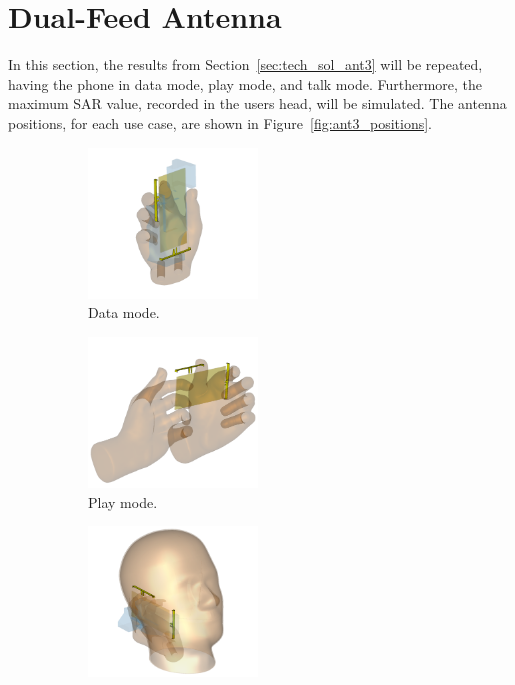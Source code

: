 \section{Dual-Feed Antenna}
In this section, the results from Section~\ref{sec:tech_sol_ant3} will be repeated, having the phone in data mode, play mode, and talk mode. Furthermore, the maximum SAR value, recorded in the users head, will be simulated. The antenna positions, for each use case, are shown in Figure~\ref{fig:ant3_positions}.

\begin{figure}[htbp]
    \centering
    \begin{subfigure}[b]{0.24\linewidth}
        \centering
        \includegraphics[width=\linewidth,height=4cm,keepaspectratio]{img/tech_sol/nonresonant/simulation/data_mode/3d}
        \caption{Data mode.}
    \end{subfigure}
    \begin{subfigure}[b]{0.24\linewidth}
        \centering
        \includegraphics[width=\linewidth,height=4cm,keepaspectratio]{img/tech_sol/nonresonant/simulation/play_mode/3d}
        \caption{Play mode.}
    \end{subfigure}
    \begin{subfigure}[b]{0.24\linewidth}
        \centering
        \includegraphics[width=\linewidth,height=4cm,keepaspectratio]{img/tech_sol/nonresonant/simulation/talk_mode/3d}

\end{subfigure}
\end{figure}
